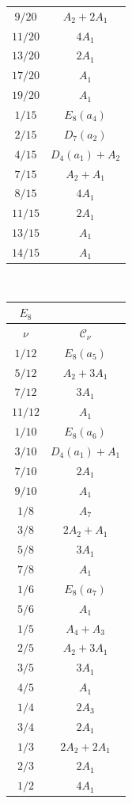 \documentclass[11pt]{amsart}
\theoremstyle{definition}
\newcommand{\cC}{\mathcal{C}}
\begin{document}
\begin{table}[H]
\begin{tabular}{|c|c|}
$9/20$  & $A_2+2A_1$        \\
$11/20$ & $4A_1$            \\
$13/20$ & $2A_1$            \\
$17/20$ & $A_1$             \\
$19/20$ & $A_1$             \\
$1/15$  & $E_8(a_4)$        \\
$2/15$  & $D_7(a_2)$        \\
$4/15$  & $D_4(a_1)+A_2$    \\
$7/15$  & $A_2+A_1$         \\
$8/15$  & $4A_1$            \\
$11/15$ & $2A_1$            \\
$13/15$ & $A_1$             \\
$14/15$ & $A_1$             \\
\hline
\end{tabular}
\, 
\begin{tabular}{|c|c|}
\multicolumn{1}{c}{$E_8$} & \multicolumn{1}{c}{} \\ 
\hline
$\nu$ & $\cC_\nu$ \\
\hline
$1/12$  & $E_8(a_5)$        \\
$5/12$  & $A_2+3A_1$        \\
$7/12$  & $3A_1$            \\
$11/12$ & $A_1$             \\
$1/10$ & $E_8(a_6)$        \\
$3/10$ & $D_4(a_1)+A_1$    \\
$7/10$ & $2A_1$            \\
$9/10$ & $A_1$             \\
$1/8$ & $A_7$              \\
$3/8$ & $2A_2+A_1$         \\
$5/8$ & $3A_1$             \\
$7/8$ & $A_1$              \\
$1/6$ & $E_8(a_7)$          \\
$5/6$ & $A_1$               \\
$1/5$ & $A_4+A_3$           \\
$2/5$ & $A_2+3A_1$          \\
$3/5$ & $3A_1$              \\
$4/5$ & $A_1$               \\
$1/4$ & $2A_3$              \\
$3/4$ & $2A_1$              \\
$1/3$ & $2A_2+2A_1$          \\
$2/3$ & $2A_1$               \\
$1/2$ & $4A_1$               \\
\hline
\end{tabular}
\label{ta:unipotent}
\end{table}
\end{document}
